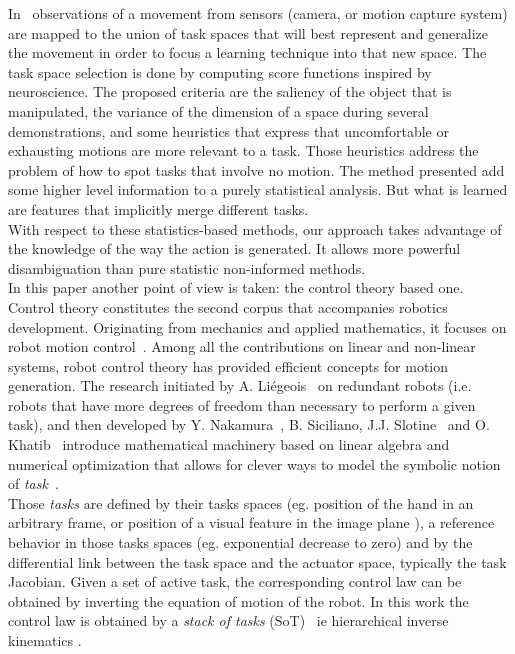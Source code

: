 \documentclass[letterpaper, 10pt, conference]{ieeeconf}      %
\begin{document}
In~\cite{muhlig09} observations of a movement from sensors (camera, or motion capture system)
are mapped to the union of task spaces that will best represent and generalize the movement in order to focus
a learning technique into that new space. The task space selection is
done by computing score functions inspired by neuroscience. The proposed criteria are
the saliency of the object that is manipulated, the variance of the dimension
of a space during several demonstrations, and some heuristics that express that
uncomfortable or exhausting motions are more relevant to a task. Those heuristics
address the problem of how to spot tasks that involve no motion. The method
presented add some higher level information to a purely statistical analysis. 
But what is learned are features that implicitly merge different tasks.\\

With respect to these statistics-based methods, our approach takes advantage of the
knowledge of the way the action is generated. It allows more powerful
disambiguation than pure statistic non-informed methods.\\

In this paper another point of view is taken: the control theory based
one. Control theory constitutes the second corpus that accompanies
robotics development. Originating from mechanics and applied
mathematics, it focuses on robot motion control~\cite{murray94,
siciliano10}. Among all the
contributions on linear and non-linear systems, robot control theory has
provided efficient concepts for motion generation. The research
initiated by A. Li\'egeois~\cite{liegeois77} on redundant robots (i.e. robots that have
more degrees of freedom than necessary to perform a given task), and
then developed by Y. Nakamura~\cite{nakamura91}, B. Siciliano, J.J. Slotine~\cite{siciliano91} and O.
Khatib~\cite{khatib87} introduce mathematical machinery based on linear algebra and
numerical optimization that allows for clever ways to model the symbolic
notion of \emph{task}~\cite{samson91}.\\

Those \emph{tasks} are defined by their tasks spaces (eg. position of the hand
in an arbitrary frame\cite{nakamura86a,khatib87}, or position of a visual feature in the image
plane \cite{espiau92,hutchinson96a}), a reference behavior in those tasks spaces
(eg. exponential decrease to zero) and by the differential link between
the task space and the actuator space, typically the task Jacobian.
Given a set of active task, the corresponding control law can be
obtained by inverting the equation of motion of the robot. In this work
the control law is obtained by a \emph{stack of tasks}
(SoT)~\cite{mansard07} ie hierarchical inverse kinematics
\cite{siciliano91}.\\
\end{document}
